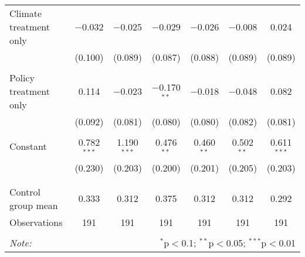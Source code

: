 \begin{tabular}{@{\extracolsep{5pt}}lcccccc}
 Climate treatment only & $-$0.032 & $-$0.025 & $-$0.029 & $-$0.026 & $-$0.008 & 0.024 \\ 
  & (0.100) & (0.089) & (0.087) & (0.088) & (0.089) & (0.089) \\ 
  & & & & & & \\ 
 Policy treatment only & 0.114 & $-$0.023 & $-$0.170$^{**}$ & $-$0.018 & $-$0.048 & 0.082 \\ 
  & (0.092) & (0.081) & (0.080) & (0.080) & (0.082) & (0.081) \\ 
  & & & & & & \\ 
 Constant & 0.782$^{***}$ & 1.190$^{***}$ & 0.476$^{**}$ & 0.460$^{**}$ & 0.502$^{**}$ & 0.611$^{***}$ \\ 
  & (0.230) & (0.203) & (0.200) & (0.201) & (0.205) & (0.203) \\ 
  & & & & & & \\ 
\hline \\[-1.8ex] 
Control group mean & 0.333 & 0.312 & 0.375 & 0.312 & 0.312 & 0.292 \\ 
Observations & 191 & 191 & 191 & 191 & 191 & 191 \\ 
\hline 
\hline \\[-1.8ex] 
\textit{Note:}  & \multicolumn{6}{r}{$^{*}$p$<$0.1; $^{**}$p$<$0.05; $^{***}$p$<$0.01} \\ 
\end{tabular} 
